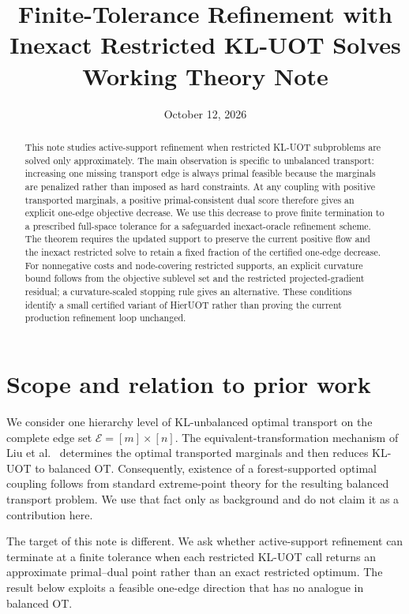 \documentclass[11pt]{article}
\title{Finite-Tolerance Refinement with Inexact Restricted KL-UOT Solves\\\large Working Theory Note}
\author{}
\date{October 12, 2026}
\begin{document}
\maketitle

\begin{abstract}
This note studies active-support refinement when restricted KL-UOT subproblems are solved only approximately.
The main observation is specific to unbalanced transport: increasing one missing transport edge is always primal feasible because the marginals are penalized rather than imposed as hard constraints.
At any coupling with positive transported marginals, a positive primal-consistent dual score therefore gives an explicit one-edge objective decrease.
We use this decrease to prove finite termination to a prescribed full-space tolerance for a safeguarded inexact-oracle refinement scheme.
The theorem requires the updated support to preserve the current positive flow and the inexact restricted solve to retain a fixed fraction of the certified one-edge decrease.
For nonnegative costs and node-covering restricted supports, an explicit curvature bound follows from the objective sublevel set and the restricted projected-gradient residual; a curvature-scaled stopping rule gives an alternative.
These conditions identify a small certified variant of HierUOT rather than proving the current production refinement loop unchanged.
\end{abstract}

\section{Scope and relation to prior work}

We consider one hierarchy level of KL-unbalanced optimal transport on the complete edge set $\mathcal E=[m]\times[n]$.
The equivalent-transformation mechanism of Liu et al.~\cite{liu2025etm} determines the optimal transported marginals and then reduces KL-UOT to balanced OT.
Consequently, existence of a forest-supported optimal coupling follows from standard extreme-point theory for the resulting balanced transport problem.
We use that fact only as background and do not claim it as a contribution here.

The target of this note is different.
We ask whether active-support refinement can terminate at a finite tolerance when each restricted KL-UOT call returns an approximate primal--dual point rather than an exact restricted optimum.
The result below exploits a feasible one-edge direction that has no analogue in balanced OT.
\end{document}
